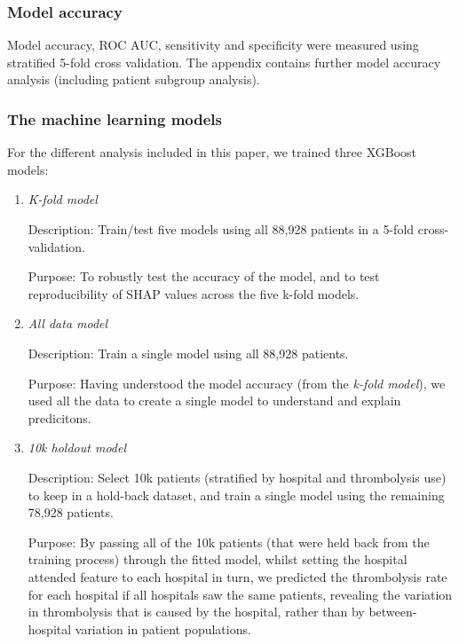 \subsubsection{Model accuracy}
Model accuracy, ROC AUC, sensitivity and specificity were measured using stratified 5-fold cross validation. The appendix contains further model accuracy analysis (including patient subgroup analysis).

\subsubsection{The machine learning models}

For the different analysis included in this paper, we trained three XGBoost models:
\begin{enumerate}
    \item {\emph{K-fold model}}
    
    Description: Train/test five models using all 88,928 patients in a 5-fold cross-validation.
    
    Purpose: To robustly test the accuracy of the model, and to test reproducibility of SHAP values across the five k-fold models.%
    \item {\emph{All data model}}
    
    Description: Train a single model using all 88,928 patients.
    
    Purpose: Having understood the model accuracy (from the \emph{k-fold model}), we used all the data to create a single model to understand and explain predicitons.
    
    \item {\emph{10k holdout model}}

    Description: Select 10k patients (stratified by hospital and thrombolysis use) to keep in a hold-back dataset, and train a single model using the remaining 78,928 patients. 
    
    Purpose: By passing all of the 10k patients (that were held back from the training process) through the fitted model, whilst setting the hospital attended feature to each hospital in turn, we predicted the thrombolysis rate for each hospital if all hospitals saw the same patients, revealing the variation in thrombolysis that is caused by the hospital, rather than by between-hospital variation in patient populations.
\end{enumerate}


